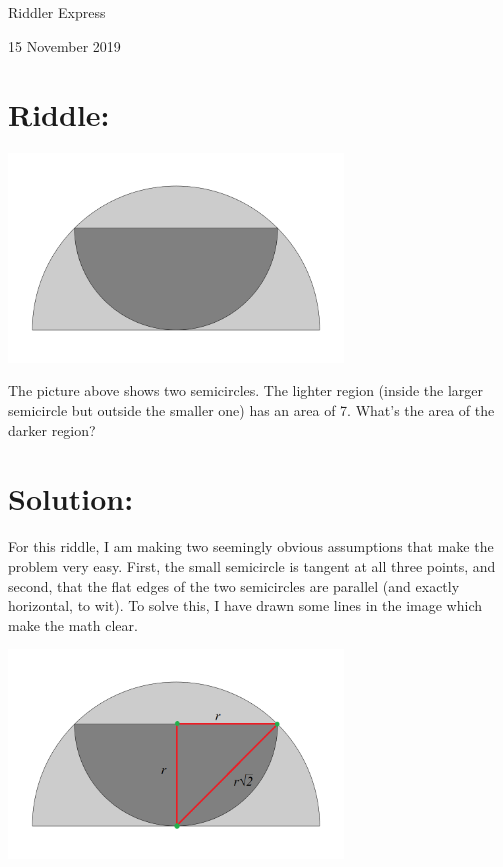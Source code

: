 \documentclass{article}
\begin{document}
\pagestyle{empty} %

\begin{center}
{\LARGE Riddler Express}

\vspace{0.15in}

{\Large 15 November 2019}
\end{center}


\section*{Riddle:}

\begin{center}
\includegraphics[width=3.5in]{halfcircles.png}
\end{center}

The picture above shows two semicircles.
The lighter region (inside the larger semicircle but outside the smaller one) has an area of 7.
What’s the area of the darker region?


\section*{Solution:}

For this riddle, I am making two seemingly obvious assumptions that make the problem very easy.
First, the small semicircle is tangent at all three points, and second, that the flat edges of the two semicircles are parallel (and exactly horizontal, to wit).
To solve this, I have drawn some lines in the image which make the math clear.

\begin{center}
\includegraphics[width=3.5in]{halfcircles_labeled.png}
\end{center}
\end{document}
